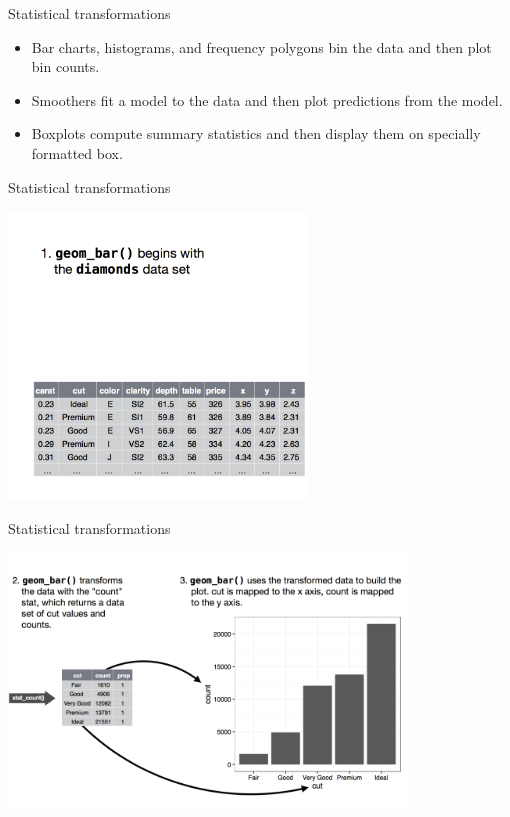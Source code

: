 \documentclass[ignorenonframetext,]{beamer}
\begin{document}
\begin{frame}{Statistical transformations}
\protect\hypertarget{statistical-transformations-1}{}

\begin{itemize}
\item
  Bar charts, histograms, and frequency polygons bin the data and then
  plot bin counts.
\item
  Smoothers fit a model to the data and then plot predictions from the
  model.
\item
  Boxplots compute summary statistics and then display them on specially
  formatted box.
\end{itemize}

\end{frame}

\begin{frame}{Statistical transformations}
\protect\hypertarget{statistical-transformations-2}{}

\includegraphics[width=3.125in,height=\textheight]{figures/st1.png}

\end{frame}

\begin{frame}{Statistical transformations}
\protect\hypertarget{statistical-transformations-3}{}

\includegraphics[width=4.16667in,height=\textheight]{figures/st2.png}

\end{frame}
\end{document}
